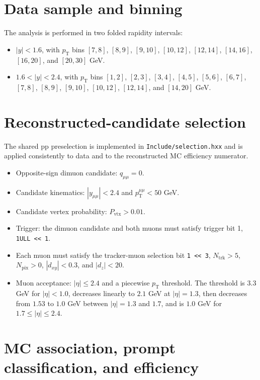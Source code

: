 \documentclass[11pt]{article}
\begin{document}
\section{Data sample and binning}

The analysis is performed in two folded rapidity intervals:
\begin{itemize}
  \item $|y|<1.6$, with $p_\mathrm{T}$ bins $[7,8]$, $[8,9]$, $[9,10]$, $[10,12]$, $[12,14]$, $[14,16]$, $[16,20]$, and $[20,30]$ GeV.
  \item $1.6<|y|<2.4$, with $p_\mathrm{T}$ bins $[1,2]$, $[2,3]$, $[3,4]$, $[4,5]$, $[5,6]$, $[6,7]$, $[7,8]$, $[8,9]$, $[9,10]$, $[10,12]$, $[12,14]$, and $[14,20]$ GeV.
\end{itemize}

\section{Reconstructed-candidate selection}

The shared pp preselection is implemented in \texttt{Include/selection.hxx} and is applied consistently to data and to the reconstructed MC efficiency numerator.
\begin{itemize}
  \item Opposite-sign dimuon candidate: $q_{\mu\mu}=0$.
  \item Candidate kinematics: $|y_{\mu\mu}|<2.4$ and $p_\mathrm{T}^{\mu\mu}<50$ GeV.
  \item Candidate vertex probability: $P_\mathrm{vtx}>0.01$.
  \item Trigger: the dimuon candidate and both muons must satisfy trigger bit 1, \texttt{1ULL << 1}.
  \item Each muon must satisfy the tracker-muon selection bit \texttt{1 << 3}, $N_\mathrm{trk}>5$, $N_\mathrm{pix}>0$, $|d_{xy}|<0.3$, and $|d_z|<20$.
  \item Muon acceptance: $|\eta|\le 2.4$ and a piecewise $p_\mathrm{T}$ threshold. The threshold is $3.3$ GeV for $|\eta|<1.0$, decreases linearly to $2.1$ GeV at $|\eta|=1.3$, then decreases from $1.53$ to $1.0$ GeV between $|\eta|=1.3$ and $1.7$, and is $1.0$ GeV for $1.7\le|\eta|\le2.4$.
\end{itemize}

\section{MC association, prompt classification, and efficiency}
\end{document}
